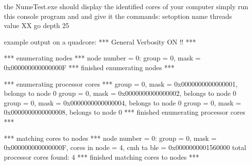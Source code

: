 the NumeTest.exe should display the identified cores of your computer
simply run this console program and and give it the commands:
setoption name threads value XX
go depth 25

example output on a quadcore:
 *** General Verbosity ON !! ***

*** enumerating nodes ***
node number = 0: group = 0, mask = 0x000000000000000F
*** finished enumerating nodes ***

*** enumerating processor cores ***
 group = 0, mask = 0x0000000000000001, belongs to node 0
 group = 0, mask = 0x0000000000000002, belongs to node 0
 group = 0, mask = 0x0000000000000004, belongs to node 0
 group = 0, mask = 0x0000000000000008, belongs to node 0
*** finished enumerating processor cores ***

*** matching cores to nodes ***
node number = 0: group = 0, mask = 0x000000000000000F, cores in node = 4, cmh ta
ble = 0x0000000001560000
 total processor cores found: 4
*** finished matching cores to nodes ***

